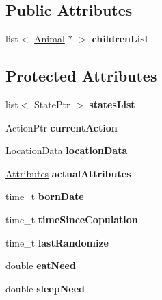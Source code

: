 \subsection*{Public Attributes}
\begin{DoxyCompactItemize}
\item 
\hypertarget{class_animal_a94a0b9dc3fa747aea4eaed4d615bcb32}{}list$<$ \hyperlink{class_animal}{Animal} $\ast$ $>$ {\bfseries children\+List}\label{class_animal_a94a0b9dc3fa747aea4eaed4d615bcb32}

\end{DoxyCompactItemize}
\subsection*{Protected Attributes}
\begin{DoxyCompactItemize}
\item 
\hypertarget{class_animal_aaa6816af2bd90c9988e1393fc2b57199}{}list$<$ State\+Ptr $>$ {\bfseries states\+List}\label{class_animal_aaa6816af2bd90c9988e1393fc2b57199}

\item 
\hypertarget{class_animal_ab0da50ec5f81ba73009c4c658753a03d}{}Action\+Ptr {\bfseries current\+Action}\label{class_animal_ab0da50ec5f81ba73009c4c658753a03d}

\item 
\hypertarget{class_animal_a2f521f0bb872d3ffe82e4f0d1e816abe}{}\hyperlink{struct_location_data}{Location\+Data} {\bfseries location\+Data}\label{class_animal_a2f521f0bb872d3ffe82e4f0d1e816abe}

\item 
\hypertarget{class_animal_a717f0c6ca49f0b22eaf1a7198f1e1a1b}{}\hyperlink{class_attributes}{Attributes} {\bfseries actual\+Attributes}\label{class_animal_a717f0c6ca49f0b22eaf1a7198f1e1a1b}

\item 
\hypertarget{class_animal_aefbe1292bd5be337de52faf38d9b4862}{}time\+\_\+t {\bfseries born\+Date}\label{class_animal_aefbe1292bd5be337de52faf38d9b4862}

\item 
\hypertarget{class_animal_a944296b52e238a919c56f3738bd31989}{}time\+\_\+t {\bfseries time\+Since\+Copulation}\label{class_animal_a944296b52e238a919c56f3738bd31989}

\item 
\hypertarget{class_animal_aed941628e1e462bb2199398db8251192}{}time\+\_\+t {\bfseries last\+Randomize}\label{class_animal_aed941628e1e462bb2199398db8251192}

\item 
\hypertarget{class_animal_a682b0dadf7726ee266415c27b351de42}{}double {\bfseries eat\+Need}\label{class_animal_a682b0dadf7726ee266415c27b351de42}

\item 
\hypertarget{class_animal_abfdde3c7e89db79ef04abc9312648206}{}double {\bfseries sleep\+Need}\label{class_animal_abfdde3c7e89db79ef04abc9312648206}

\end{DoxyCompactItemize}


